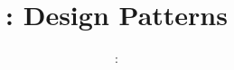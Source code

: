 \usepackage{../../beamerthemeFalmouthGamesAcademy}
\usepackage{multimedia}
\graphicspath{ {../../} }


\usepackage[normalem]{ulem}
\usepackage{wasysym}

\usepackage{pdfpages}

\usetikzlibrary{arrows,automata}




\title{\sessionnumber: Design Patterns}
\subtitle{\modulecode: \moduletitle}

\frame{\titlepage} 

